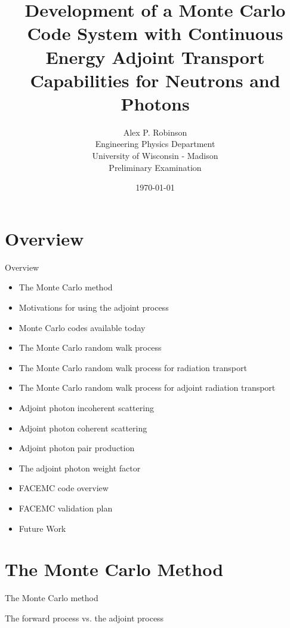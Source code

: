 \documentclass{beamer}
\author{Alex P. Robinson
    \\ Engineering Physics Department
    \\ University of Wisconsin - Madison
    \\ Preliminary Examination
}
\date{\today}
\title{Development of a Monte Carlo Code System with Continuous Energy Adjoint Transport Capabilities for Neutrons and Photons}
\begin{document}
\maketitle
\section{Overview}
\begin{frame}{Overview}

\begin{itemize}
  \item The Monte Carlo method
  \item Motivations for using the adjoint process
  \item Monte Carlo codes available today
  \item The Monte Carlo random walk process
  \item The Monte Carlo random walk process for radiation transport
  \item The Monte Carlo random walk process for adjoint radiation transport
  \item Adjoint photon incoherent scattering
  \item Adjoint photon coherent scattering
  \item Adjoint photon pair production
  \item The adjoint photon weight factor
  \item FACEMC code overview
  \item FACEMC validation plan
  \item Future Work
\end{itemize}

\end{frame}

\section{The Monte Carlo Method}
\begin{frame}{The Monte Carlo method}

\end{frame}

\begin{frame}{The forward process vs. the adjoint process}

\end{frame}
\end{document}
